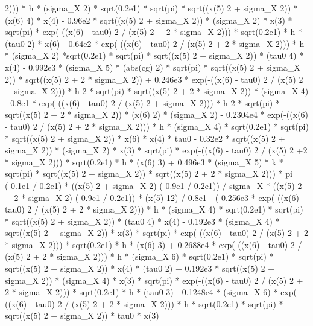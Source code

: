 \begin{maplegroup}
2))) * h * (sigma\_X  2) * sqrt(0.2e1) * sqrt(pi) * sqrt((x(5)  2 + sigma\_X  2)) * (x(6)  4) * x(4) - 0.96e2 * sqrt((x(5)  2 + sigma\_X  2)) * (sigma\_X  2) * x(3) * sqrt(pi) * exp(-((x(6) - tau0)  2 / (x(5)  2 + 2 * sigma\_X  2))) * sqrt(0.2e1) * h * (tau0  2) * x(6) - 0.64e2 * exp(-((x(6) - tau0)  2 / (x(5)  2 + 2 * sigma\_X  2))) * h * (sigma\_X  2) *sqrt(0.2e1) * sqrt(pi) * sqrt((x(5)  2 + sigma\_X  2)) * (tau0  4) * x(4) - 0.992e3 * (sigma\_X  5) * (abs(cg)  2) * sqrt(pi) * sqrt((x(5)  2 + sigma\_X  2)) * sqrt((x(5)  2 + 2 * sigma\_X  2)) + 0.246e3 * exp(-((x(6) - tau0)  2 / (x(5)  2 + sigma\_X 2))) * h  2 * sqrt(pi) * sqrt((x(5)  2 + 2 * sigma\_X  2)) * (sigma\_X  4) - 0.8e1 * exp(-((x(6) - tau0)  2 / (x(5)  2 + sigma\_X  2))) * h  2 * sqrt(pi) * sqrt((x(5)  2 + 2 * sigma\_X  2)) * (x(6)  2) * (sigma\_X  2) - 0.2304e4 * exp(-((x(6) - tau0)  2 / (x(5)  2 + 2 * sigma\_X  2))) * h * (sigma\_X  4) * sqrt(0.2e1) * sqrt(pi) * sqrt((x(5)  2 + sigma\_X  2)) * x(6) * x(4) * tau0 - 0.32e2 * sqrt((x(5)  2 + sigma\_X  2)) * (sigma\_X  2) * x(3) * sqrt(pi) * exp(-((x(6) - tau0)  2 / (x(5)  2 +2 * sigma\_X  2))) * sqrt(0.2e1) * h * (x(6)  3) + 0.496e3 * (sigma\_X  5) * k * sqrt(pi) * sqrt((x(5)  2 + sigma\_X  2)) * sqrt((x(5)  2 + 2 * sigma\_X  2))) * pi  (-0.1e1 / 0.2e1) * ((x(5)  2 + sigma\_X  2)  (-0.9e1 / 0.2e1)) / sigma\_X * ((x(5) 2 + 2 * sigma\_X  2)  (-0.9e1 / 0.2e1)) * (x(5)  12) / 0.8e1 - (-0.256e3 * exp(-((x(6) - tau0)  2 / (x(5)  2 + 2 * sigma\_X  2))) * h * (sigma\_X  4) * sqrt(0.2e1) * sqrt(pi) * sqrt((x(5)  2 + sigma\_X  2)) * (tau0  4) * x(4) - 0.192e3 * (sigma\_X  4) * sqrt((x(5)  2 + sigma\_X  2)) * x(3) * sqrt(pi) * exp(-((x(6) - tau0)  2 / (x(5)  2 + 2 * sigma\_X  2))) * sqrt(0.2e1) * h * (x(6)  3) + 0.2688e4 * exp(-((x(6) - tau0)  2 / (x(5)  2 + 2 * sigma\_X  2))) * h * (sigma\_X  6) * sqrt(0.2e1) * sqrt(pi) * sqrt((x(5)  2 + sigma\_X  2)) * x(4) * (tau0  2) + 0.192e3 * sqrt((x(5)  2 + sigma\_X  2)) * (sigma\_X  4) * x(3) * sqrt(pi) * exp(-((x(6) - tau0)  2 / (x(5)  2 + 2 * sigma\_X  2))) * sqrt(0.2e1) * h * (tau0  3) - 0.1248e4 * (sigma\_X  6) * exp(-((x(6) - tau0)  2 / (x(5)  2 + 2 * sigma\_X  2))) * h * sqrt(0.2e1) * sqrt(pi) * sqrt((x(5)  2 + sigma\_X  2)) * tau0 * x(3) 
\end{maplegroup}
